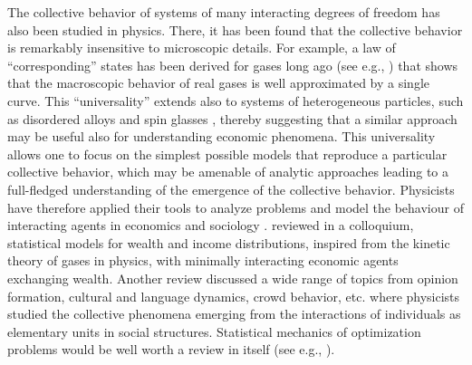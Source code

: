\documentclass[aps,twocolumn,nofootinbib,sortedaddress,reprint]{revtex4-1}
\begin{document}
The collective behavior of systems of many interacting degrees of freedom has also been studied in physics. There, it has been found that the collective behavior is remarkably insensitive  to microscopic details. For example, a law of ``corresponding'' states has been derived for gases long ago (see e.g., \textcite{huang1987book}) that shows that the macroscopic behavior of real gases is well approximated by a single curve. This ``universality'' extends also to systems of heterogeneous particles, such as disordered alloys and spin glasses \cite{MPV}, thereby suggesting that a similar approach may be useful also for understanding economic phenomena. This universality allows one to focus on the simplest possible models that reproduce a particular collective behavior, which may be amenable of analytic approaches leading to a full-fledged understanding of the emergence of the collective behavior.
Physicists have therefore applied their tools to analyze problems and model the behaviour of interacting agents in economics and sociology \cite{Chakrabarti2006,Sinha2010,Chakrabarti2013,mantegna1999,bouchaud2000,chakraborti2011a,chakraborti2011b}. \textcite{Yakovenko2009} reviewed in a colloquium, statistical models for wealth and income distributions, inspired from the  kinetic theory of gases in physics, with minimally interacting economic agents exchanging wealth.
Another review \cite{Castellano2009}  discussed a wide range of topics from opinion formation, cultural and language dynamics,  crowd behavior, etc. where physicists studied the collective phenomena emerging from the interactions of individuals as elementary units in social structures.  Statistical mechanics of optimization problems would be well worth a review in itself (see e.g., \textcite{mezard2009information,krzakala2012compressedsensing,mezard2002k-sat}).
\end{document}
